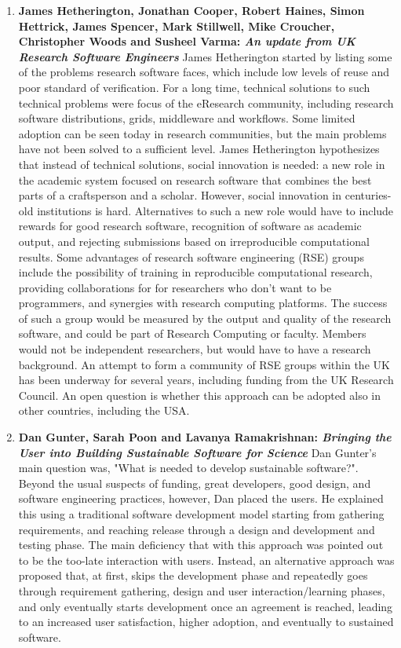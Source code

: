 \documentclass[11pt, oneside]{amsart}
\begin{document}
\begin{enumerate}
\item \textbf{James Hetherington, Jonathan Cooper, Robert Haines, Simon
Hettrick, James Spencer, Mark Stillwell, Mike Croucher, Christopher Woods and
Susheel Varma: \textit{An update from UK Research Software Engineers}} James
Hetherington started by listing some of the problems research software faces,
which include low levels of reuse and poor standard of verification. For a long
time, technical solutions to such technical problems were focus of the eResearch
community, including research software distributions, grids, middleware and
workflows. Some limited adoption can be seen today in research communities, but
the main problems have not been solved to a sufficient level. James Hetherington
hypothesizes that instead of technical solutions, social innovation is needed: a
new role in the academic system focused on research software that combines the
best parts of a craftsperson and a scholar. However, social innovation in
centuries-old institutions is hard. Alternatives to such a new role would have
to include rewards for good research software, recognition of software as
academic output, and rejecting submissions based on irreproducible computational
results. Some advantages of research software engineering (RSE) groups include
the possibility of training in reproducible computational research, providing
collaborations for for researchers who don't want to be programmers, and
synergies with research computing platforms. The success of such a group would
be measured by the output and quality of the research software, and could be
part of Research Computing or faculty. Members would not be independent
researchers, but would have to have a research background. An attempt to form a
community of RSE groups within the UK has been underway for several years,
including funding from the UK Research Council. An open question is whether this
approach can be adopted also in other countries, including the USA.

\item \textbf{Dan Gunter, Sarah Poon and Lavanya Ramakrishnan: \textit{Bringing
the User into Building Sustainable Software for Science}} Dan Gunter's main
question was, "What is needed to develop sustainable software?". Beyond the
usual suspects of funding, great developers, good design, and software
engineering practices, however, Dan placed the users. He explained this using a
traditional software development model starting from gathering requirements, and
reaching release through a design and development and testing phase. The main
deficiency that with this approach was pointed out to be the too-late
interaction with users. Instead, an alternative approach was proposed that, at
first, skips the development phase and repeatedly goes through requirement
gathering, design and user interaction/learning phases, and only eventually
starts development once an agreement is reached, leading to an increased user
satisfaction, higher adoption, and eventually to sustained software.


\end{enumerate}
\end{document}
